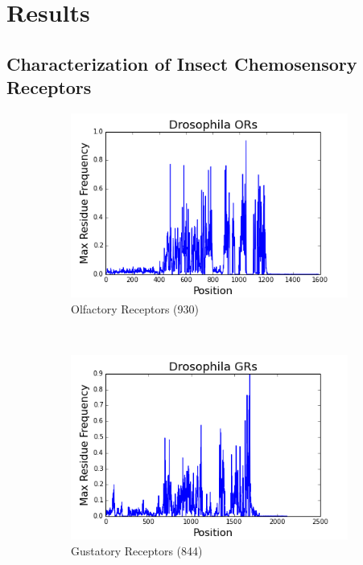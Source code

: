 \section{Results}

\subsection{Characterization of Insect Chemosensory Receptors}

\begin{figure}[H]
  \centering
  \begin{subfigure}[b]{0.45\textwidth}
    \includegraphics[width=\textwidth]{figures/chemosensory/drosophila_or_max_freq.png}
    \caption{Olfactory Receptors (930)}
    \label{fig:chemosensory:or-max-freq}
  \end{subfigure}
  ~
  \begin{subfigure}[b]{0.45\textwidth}
    \includegraphics[width=\textwidth]{figures/chemosensory/drosophila_gr_max_freq.png}
    \caption{Gustatory Receptors (844)}
    \label{fig:chemosensory:gr-max-freq}
  \end{subfigure}
\label{fig:chemosensory:max-freq}
\caption{}
\end{figure}

